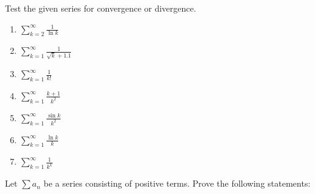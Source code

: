\documentclass[week=6]{homework}
\date{\today}
\begin{document}
    \maketitle
    \thispagestyle{empty}
    \newpage
    \begin{questions}
		\let\firstquestion\question
		\renewcommand*{\question}{\vspace{7mm}\firstquestion}
        \firstquestion
        Test the given series for convergence or divergence.
        \begin{enumerate}[label=(\alph*)]
        	\item $\displaystyle \sum_{k=2}^{\infty} \frac{1}{\ln k}$
        	
        	
        	\item $\displaystyle \sum_{k=1}^{\infty} \frac{1}{\sqrt k + 1.1}$
        	
        	
        	\addtocounter{enumi}{2}
        	\item $\displaystyle \sum_{k=1}^{\infty} \frac{1}{k!}$
        	
        	
        	\item $\displaystyle \sum_{k=1}^{\infty} \frac{k+1}{k^2}$
        	
        	
        	\addtocounter{enumi}{3}
        	\item $\displaystyle \sum_{k=1}^{\infty} \frac{\sin k}{k^2}$
        	
        	
        	\item $\displaystyle \sum_{k=1}^{\infty} \frac{\ln k}{k}$
        	
        	
        	\addtocounter{enumi}{1}
        	\item $\displaystyle \sum_{k=1}^{\infty} \frac{1}{k^k}$
        	
        \end{enumerate}
	    
	    \question
	    Let $\sum a_n$ be a series consisting of positive terms. Prove the following statements:
\end{questions}
\end{document}
